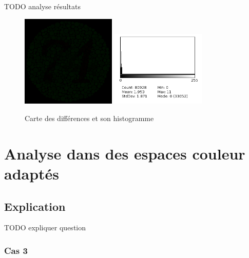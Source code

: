 \documentclass[a4paper]{article}
\begin{document}
TODO analyse résultats

\begin{figure}[H]
\begin{center}
\includegraphics[width=170px]{../resultats/e3_q1_diff.png}
\includegraphics[width=170px]{../resultats/e3_q1_diff_hist.png}
\end{center}
\caption{Carte des différences et son histogramme}
\end{figure}

\clearpage


\section{Analyse dans des espaces couleur adaptés}

\subsection{Explication}

TODO expliquer question

\subsubsection{Cas 3}
\end{document}
